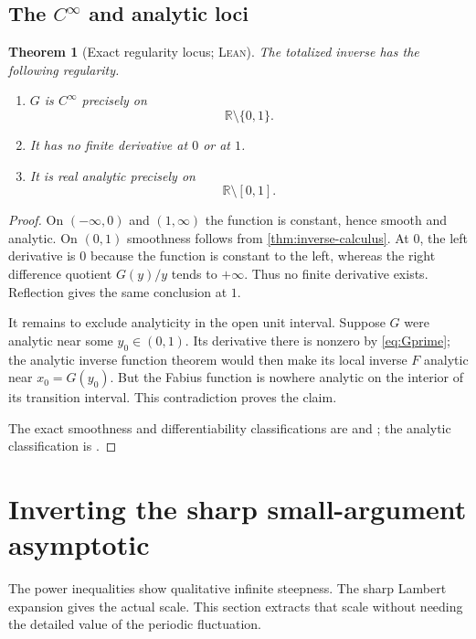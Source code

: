 \documentclass[11pt,oneside]{article}
\newtheorem{theorem}{Theorem}[section]
\theoremstyle{definition}
\theoremstyle{remark}
\newcommand{\R}{\mathbb R}
\newcommand{\InvF}{G}
\newcommand{\Formalized}{\textsc{Lean}}
\begin{document}
\subsection{\texorpdfstring{The \(C^\infty\) and analytic loci}{The smooth and analytic loci}}

\begin{theorem}[Exact regularity locus; \Formalized]
\label{thm:inverse-regularity}
The totalized inverse has the following regularity.
\begin{enumerate}
\item $\InvF$ is $C^\infty$ precisely on
\[
 \R\setminus\{0,1\}.
\]
\item It has no finite derivative at $0$ or at $1$.
\item It is real analytic precisely on
\[
 \R\setminus[0,1].
\]
\end{enumerate}
\end{theorem}

\begin{proof}
On $(-\infty,0)$ and $(1,\infty)$ the function is constant, hence smooth
and analytic.  On $(0,1)$ smoothness follows from
\cref{thm:inverse-calculus}.  At $0$, the left derivative is $0$ because
the function is constant to the left, whereas the right difference
quotient $\InvF(y)/y$ tends to $+\infty$.  Thus no finite derivative
exists.  Reflection gives the same conclusion at $1$.

It remains to exclude analyticity in the open unit interval.  Suppose
$\InvF$ were analytic near some $y_0\in(0,1)$.  Its derivative there is
nonzero by \eqref{eq:Gprime}; the analytic inverse function theorem would
then make its local inverse $F$ analytic near $x_0=\InvF(y_0)$.  But the
Fabius function is nowhere analytic on the interior of its transition
interval.  This contradiction proves the claim.

The exact smoothness and differentiability classifications are
 and
; the analytic classification is
.
\end{proof}

\section{Inverting the sharp small-argument asymptotic}
\label{sec:inverse-asymptotic}

The power inequalities show qualitative infinite steepness.  The sharp
Lambert expansion gives the actual scale.  This section extracts that
scale without needing the detailed value of the periodic fluctuation.
\end{document}
